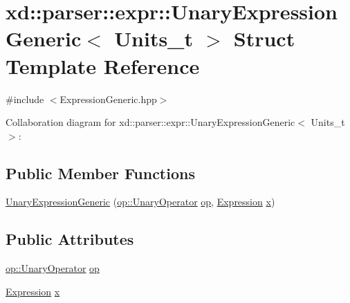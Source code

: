 \hypertarget{structxd_1_1parser_1_1expr_1_1_unary_expression_generic}{}\section{xd\+:\+:parser\+:\+:expr\+:\+:Unary\+Expression\+Generic$<$ Units\+\_\+t $>$ Struct Template Reference}
\label{structxd_1_1parser_1_1expr_1_1_unary_expression_generic}


{\ttfamily \#include $<$Expression\+Generic.\+hpp$>$}



Collaboration diagram for xd\+:\+:parser\+:\+:expr\+:\+:Unary\+Expression\+Generic$<$ Units\+\_\+t $>$\+:
\subsection*{Public Member Functions}
\begin{DoxyCompactItemize}
\item 
\mbox{\hyperlink{structxd_1_1parser_1_1expr_1_1_unary_expression_generic_a85b6a626d4373c458fd1e4cc000fb69d}{Unary\+Expression\+Generic}} (\mbox{\hyperlink{namespacexd_1_1parser_1_1expr_1_1op_ac61563bdf571a06b442d1fe819ff75bd}{op\+::\+Unary\+Operator}} \mbox{\hyperlink{structxd_1_1parser_1_1expr_1_1_unary_expression_generic_aa34399f4925254ceaa9b662bf0dbee60}{op}}, \mbox{\hyperlink{structxd_1_1parser_1_1expr_1_1_expression_generic}{Expression}} \mbox{\hyperlink{structxd_1_1parser_1_1expr_1_1_unary_expression_generic_a07577b7ad1aa661354963ad8672a1315}{x}})
\end{DoxyCompactItemize}
\subsection*{Public Attributes}
\begin{DoxyCompactItemize}
\item 
\mbox{\hyperlink{namespacexd_1_1parser_1_1expr_1_1op_ac61563bdf571a06b442d1fe819ff75bd}{op\+::\+Unary\+Operator}} \mbox{\hyperlink{structxd_1_1parser_1_1expr_1_1_unary_expression_generic_aa34399f4925254ceaa9b662bf0dbee60}{op}}
\item 
\mbox{\hyperlink{structxd_1_1parser_1_1expr_1_1_expression_generic}{Expression}} \mbox{\hyperlink{structxd_1_1parser_1_1expr_1_1_unary_expression_generic_a07577b7ad1aa661354963ad8672a1315}{x}}
\end{DoxyCompactItemize}


